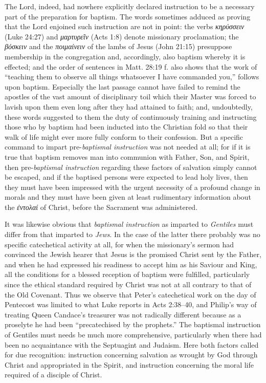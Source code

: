 The Lord, indeed, had nowhere explicitly declared instruction to be a necessary part of the preparation for baptism. The words sometimes adduced as proving that the Lord
enjoined such instruction are not in point: the verbs \emph{κηρύσσειν} (Luke 24:27) and \emph{μαρτυρεῖν} (Acts 1:8) denote missionary proclamation; the \emph{βόσκειν} and the \emph{ποιμαίνειν} of the lambs of Jesus (John 21:15) presuppose membership in the congregation and, accordingly, also baptism whereby it is effected; and the order of sentences in Matt. 28:19 f. also shows that the work of “teaching them to observe all things whatsoever I have commanded you,” follows upon baptism. Especially the last passage cannot have failed to remind the apostles of the vast amount of disciplinary toil which their Master was forced to lavish upon them even long after they had attained to faith; and, undoubtedly, these words suggested to them the duty of continuously training and instructing those who by baptism had been inducted into the Christian fold so that their walk of life might ever more fully conform to their confession. But a specific command to impart pre-\emph{baptismal instruction} was not needed at all; for if it is true that baptism removes man into communion with Father, Son, and Spirit, then pre-\emph{baptismal instruction} regarding these factors of salvation simply cannot be escaped, and if the baptised persons were expected to lead holy lives, then they must have been impressed with the urgent necessity of a profound change in morals and they must have been given at least rudimentary information about the \emph{ἐντολαί} of Christ, before the Sacrament was administered.

It was likewise obvious that \emph{baptismal instruction} as imparted to \emph{Gentiles} must differ from that imparted to \emph{Jews}. In the case of the latter there probably was no specific catechetical activity at all, for when the missionary’s sermon had convinced the Jewish hearer that Jesus is the promised Christ sent by the Father, and when he had expressed his readiness to accept him as his Saviour and King, all the conditions for a blessed reception of baptism were fulfilled, particularly since the ethical standard required by Christ was
not at all contrary to that of the Old Covenant. Thus we observe that Peter’s catechetical work on the day of Pentecost was limited to what Luke reports in Acts 2:38–40, and Philip’s way of treating Queen Candace’s treasurer was not radically different because as a proselyte he had been “precatechised by the prophets.” The baptismal instruction of Gentiles must needs be much more comprehensive, particularly when there had been no acquaintance with the Septuagint and Judaism. Here both factors called for due recognition: instruction concerning salvation as wrought by God through Christ and appropriated in the Spirit, and instruction concerning the moral life required of a disciple of Christ.

